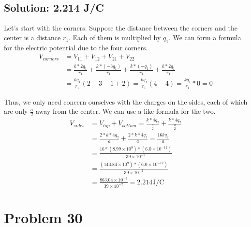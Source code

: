 \documentclass[12pt]{article}
\begin{document}
\subsection*{Solution: 2.214 \unit{\joule/\coulomb}}
Let's start with the corners.
Suppose the distance between the corners and the center is a distance $r_1$. Each of them is multiplied by $q_1$.
We can form a formula for the electric potential due to the four corners.
\begin{align*}
    V_{corners} &=  V_{11} + V_{12} + V_{21} + V_{22}\\
        &=  \frac{k*2q_1}{r_1} + \frac{k*(-3q_1)}{r_1} + \frac{k*(-q_1)}{r_1} + \frac{k*2q_1}{r_1}\\
        &=  \frac{kq_1}{r_1}(2 - 3 - 1 + 2)
        =   \frac{kq_1}{r_1}(4 - 4)
        =   \frac{kq_1}{r_1} * 0
        =   0
\end{align*}

Thus, we only need concern ourselves with the charges on the sides, each of which are only $\frac{a}{2}$ away from the center.
We can use a like formula for the two.
\begin{align*}
    V_{sides}   &=  V_{top} + V_{bottom}
        =   \frac{k*4q_2}{\frac{a}{2}} + \frac{k*4q_2}{\frac{a}{2}}\\
        &=  \frac{2*k*4q_2}{a} + \frac{2*k*4q_2}{a}
        =   \frac{16kq_2}{a}\\
        &=  \frac{16 * (8.99 \times 10^9) * (6.0 \times 10^{-12})}{39 \times 10^{-2}}\\
        &=  \frac{(143.84 \times 10^9) * (6.0 \times 10^{-12})}{39 \times 10^{-2}}\\
        &=  \frac{863.04 \times 10^{-3}}{39 \times 10^{-2}}
        =   \boxed{2.214 \unit{\joule/\coulomb}}
\end{align*}

\section{Problem 30}
\end{document}
